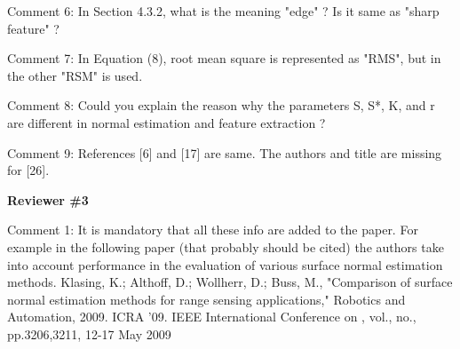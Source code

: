 \noindent
{}

\vspace{10pt}

\noindent
Comment 6: In Section 4.3.2, what is the meaning "edge" ? Is it same as "sharp feature" ?

\noindent
{}

\vspace{10pt}

\noindent
Comment 7: In Equation (8), root mean square is represented as "RMS", but in the other "RSM" is used.

\noindent
{}

\vspace{10pt}

\noindent
Comment 8: Could you explain the reason why the parameters S, S*, K, and r are different in normal estimation and feature extraction ?

\noindent
{}


\vspace{10pt}

\noindent
Comment 9: References [6] and [17] are same. The authors and title are missing for [26].

\noindent
{}

\vspace{10pt}

\noindent
{\bf Reviewer \#3}

\vspace{10pt}

\noindent
Comment 1:
It is mandatory that all these info are added to the paper.
For example in the following paper (that probably should be cited) the authors take into account performance in the evaluation of various surface normal estimation methods.
Klasing, K.; Althoff, D.; Wollherr, D.; Buss, M., "Comparison of surface normal estimation methods for range sensing applications," Robotics and Automation, 2009. ICRA '09. IEEE International Conference on , vol., no., pp.3206,3211, 12-17 May 2009

